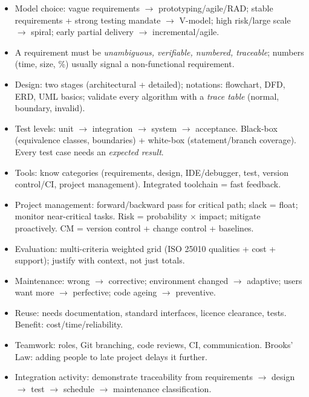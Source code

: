 \documentclass[11pt]{article}
\begin{document}
\begin{aretenir}
\begin{itemize}
\item Model choice: vague requirements $\rightarrow$ prototyping/agile/RAD; stable requirements + strong testing mandate $\rightarrow$ V-model; high risk/large scale $\rightarrow$ spiral; early partial delivery $\rightarrow$ incremental/agile.
\item A requirement must be \emph{unambiguous, verifiable, numbered, traceable}; numbers (time, size, \%) usually signal a non-functional requirement.
\item Design: two stages (architectural + detailed); notations: flowchart, DFD, ERD, UML basics; validate every algorithm with a \emph{trace table} (normal, boundary, invalid).
\item Test levels: unit $\rightarrow$ integration $\rightarrow$ system $\rightarrow$ acceptance. Black-box (equivalence classes, boundaries) + white-box (statement/branch coverage). Every test case needs an \emph{expected result}.
\item Tools: know categories (requirements, design, IDE/debugger, test, version control/CI, project management). Integrated toolchain = fast feedback.
\item Project management: forward/backward pass for critical path; slack = float; monitor near-critical tasks. Risk = probability $\times$ impact; mitigate proactively. CM = version control + change control + baselines.
\item Evaluation: multi-criteria weighted grid (ISO 25010 qualities + cost + support); justify with context, not just totals.
\item Maintenance: wrong $\rightarrow$ corrective; environment changed $\rightarrow$ adaptive; users want more $\rightarrow$ perfective; code ageing $\rightarrow$ preventive.
\item Reuse: needs documentation, standard interfaces, licence clearance, tests. Benefit: cost/time/reliability.
\item Teamwork: roles, Git branching, code reviews, CI, communication. Brooks' Law: adding people to late project delays it further.
\item Integration activity: demonstrate traceability from requirements $\rightarrow$ design $\rightarrow$ test $\rightarrow$ schedule $\rightarrow$ maintenance classification.
\end{itemize}
\end{aretenir}
\end{document}
